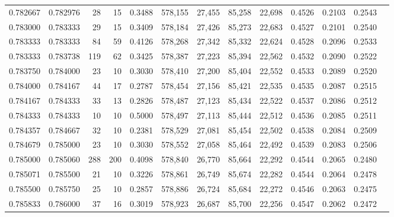 \begin{tabular}{rrrrrrrrrrrrr}
0.782667 & 0.782976 &    28 &  15 &                                     0.3488 & 578,155 &  27,455 &  85,258 &  22,698 & 0.4526 & 0.2103 & 0.2543 \\
0.783000 & 0.783333 &    29 &  15 &                                     0.3409 & 578,184 &  27,426 &  85,273 &  22,683 & 0.4527 & 0.2101 & 0.2540 \\
0.783333 & 0.783333 &    84 &  59 &                                     0.4126 & 578,268 &  27,342 &  85,332 &  22,624 & 0.4528 & 0.2096 & 0.2533 \\
0.783333 & 0.783738 &   119 &  62 &                                     0.3425 & 578,387 &  27,223 &  85,394 &  22,562 & 0.4532 & 0.2090 & 0.2522 \\
0.783750 & 0.784000 &    23 &  10 &                                     0.3030 & 578,410 &  27,200 &  85,404 &  22,552 & 0.4533 & 0.2089 & 0.2520 \\
0.784000 & 0.784167 &    44 &  17 &                                     0.2787 & 578,454 &  27,156 &  85,421 &  22,535 & 0.4535 & 0.2087 & 0.2515 \\
0.784167 & 0.784333 &    33 &  13 &                                     0.2826 & 578,487 &  27,123 &  85,434 &  22,522 & 0.4537 & 0.2086 & 0.2512 \\
0.784333 & 0.784333 &    10 &  10 &                                     0.5000 & 578,497 &  27,113 &  85,444 &  22,512 & 0.4536 & 0.2085 & 0.2511 \\
0.784357 & 0.784667 &    32 &  10 &                                     0.2381 & 578,529 &  27,081 &  85,454 &  22,502 & 0.4538 & 0.2084 & 0.2509 \\
0.784679 & 0.785000 &    23 &  10 &                                     0.3030 & 578,552 &  27,058 &  85,464 &  22,492 & 0.4539 & 0.2083 & 0.2506 \\
0.785000 & 0.785060 &   288 & 200 &                                     0.4098 & 578,840 &  26,770 &  85,664 &  22,292 & 0.4544 & 0.2065 & 0.2480 \\
0.785071 & 0.785500 &    21 &  10 &                                     0.3226 & 578,861 &  26,749 &  85,674 &  22,282 & 0.4544 & 0.2064 & 0.2478 \\
0.785500 & 0.785750 &    25 &  10 &                                     0.2857 & 578,886 &  26,724 &  85,684 &  22,272 & 0.4546 & 0.2063 & 0.2475 \\
0.785833 & 0.786000 &    37 &  16 &                                     0.3019 & 578,923 &  26,687 &  85,700 &  22,256 & 0.4547 & 0.2062 & 0.2472 \\

\end{tabular}
